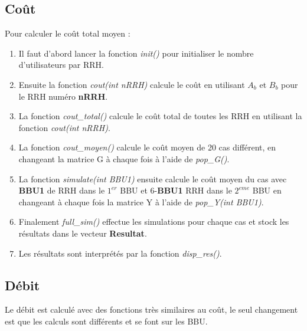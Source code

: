\documentclass[a4paper,sans,titlepage,10pt]{article}
\begin{document}
\subsection{Coût}
Pour calculer le coût total moyen :
\begin{enumerate}
\item Il faut d'abord lancer la fonction \textit{init()} pour initialiser le nombre d'utilisateurs par RRH.
\item Ensuite la fonction \textit{cout(int nRRH)} calcule le coût en utilisant $A_b$ et
$B_b$ pour le RRH numéro \textbf{nRRH}.
\item La fonction \textit{cout\_total()} calcule le coût total de toutes les RRH en utilisant la fonction \textit{cout(int nRRH)}.
\item La fonction \textit{cout\_moyen()} calcule le coût moyen de 20 cas différent, en changeant la matrice G à chaque fois à l'aide de \textit{pop\_G()}.
\item La fonction \textit{simulate(int BBU1)} ensuite calcule le coût moyen du cas avec \textbf{BBU1} de RRH dans le $1^{er}$ BBU et 6-\textbf{BBU1} RRH dans le $2^{eme}$ BBU
en changeant à chaque fois la matrice Y à l'aide de \textit{pop\_Y(int BBU1)}.
\item Finalement \textit{full\_sim()} effectue les simulations pour chaque cas et stock
les résultats dans le vecteur \textbf{Resultat}.
\item Les résultats sont interprétés par la fonction \textit{disp\_res()}.
\end{enumerate}
\subsection{Débit}
Le débit est calculé avec des fonctions très similaires au coût, le seul changement est que les calculs sont différents et se font sur les BBU.
\end{document}
